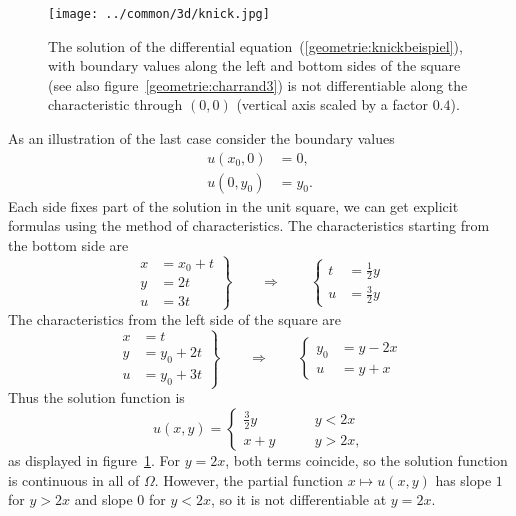 \begin{figure}
\centering
\texttt{[image: ../common/3d/knick.jpg]}
\caption{The solution of the differential
equation~(\ref{geometrie:knickbeispiel}),
with boundary values along the left and bottom sides of the square
(see also figure~\ref{geometrie:charrand3})
is not differentiable along the characteristic through $(0,0)$
(vertical axis scaled by a factor $0.4$).
\label{geometrie:knick}}
\end{figure}

As an illustration of the last case consider the boundary values
\begin{align*}
u(x_0,0)&=0,\\
u(0,y_0)&=y_0.
\end{align*}
Each side fixes part of the solution in the unit square, we can get 
explicit formulas using the method of characteristics.
The characteristics starting from the bottom side are
\[
\left.
\begin{aligned}
x&=x_0+t\\
y&=2t\\
u&=3t
\end{aligned}
\right\}
\qquad\Rightarrow\qquad
\left\{
\begin{aligned}
t&=\frac12y\\
u&=\frac32y
\end{aligned}
\right.
\]
The characteristics from the left side of the square are
\[
\left.
\begin{aligned}
x&=t\\
y&=y_0+2t\\
u&=y_0+3t
\end{aligned}
\right\}
\qquad\Rightarrow\qquad
\left\{
\begin{aligned}
y_0&=y-2x\\
u&=y+x
\end{aligned}
\right.
\]
Thus the solution function is
\[
u(x,y)=\begin{cases}
\frac32y&\qquad y<2x\\
x+y&\qquad y>2x,
\end{cases}
\]
as displayed in figure~\ref{geometrie:knick}.
For $y=2x$, both terms coincide, so the solution function is continuous
in all of $\Omega$.
However, the partial function $x\mapsto u(x,y)$ has slope $1$
for $y>2x$ and slope $0$ for $y<2x$, so it is not differentiable at $y=2x$.

